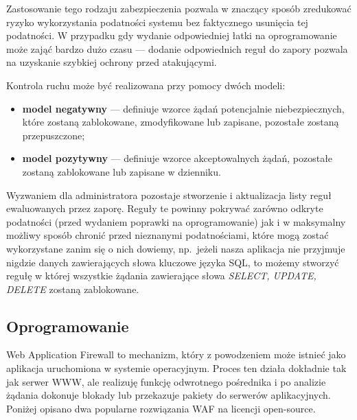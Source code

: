 \documentclass[11pt,a4paper,polish,thesis]{dcsbook}
\begin{document}
Zastosowanie tego rodzaju zabezpieczenia pozwala w znaczący sposób zredukować ryzyko wykorzystania podatności systemu bez faktycznego usunięcia tej podatności. W przypadku gdy wydanie odpowiedniej łatki na oprogramowanie może zająć bardzo dużo czasu --- dodanie odpowiednich reguł do zapory pozwala na uzyskanie szybkiej ochrony przed atakującymi.

Kontrola ruchu może być realizowana przy pomocy dwóch modeli:
\begin{itemize}
\item \textbf{model negatywny} --- definiuje wzorce żądań potencjalnie niebezpiecznych, które zostaną zablokowane, zmodyfikowane lub zapisane, pozostałe zostaną przepuszczone;
\item \textbf{model pozytywny} --- definiuje wzorce akceptowalnych żądań, pozostałe zostaną zablokowane lub zapisane w dzienniku.
\end{itemize}

Wyzwaniem dla administratora pozostaje stworzenie i aktualizacja listy reguł ewaluowanych przez zaporę. Reguły te powinny pokrywać zarówno odkryte podatności (przed wydaniem poprawki na oprogramowanie) jak i w maksymalny możliwy sposób chronić przed nieznanymi podatnościami, które mogą zostać wykorzystane zanim się o nich dowiemy, np.~jeżeli nasza aplikacja nie przyjmuje nigdzie danych zawierających słowa kluczowe języka SQL, to możemy stworzyć regułę w której wszystkie żądania zawierające słowa \textit{SELECT, UPDATE, DELETE} zostaną zablokowane.

\subsection{Oprogramowanie}
Web Application Firewall to mechanizm, który z powodzeniem może istnieć jako aplikacja uruchomiona w systemie operacyjnym. Proces ten działa dokładnie tak jak serwer WWW, ale realizuję funkcję odwrotnego pośrednika i po analizie żądania dokonuje blokady lub przekazuje pakiety do serwerów aplikacyjnych. Poniżej opisano dwa popularne rozwiązania WAF na licencji open-source.
\end{document}
